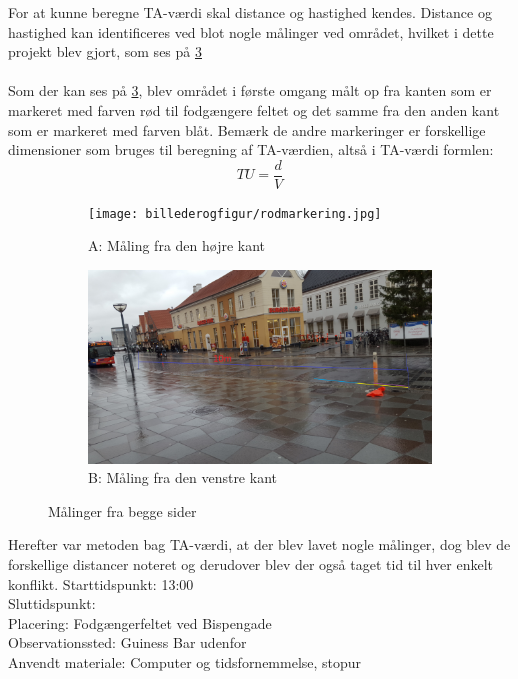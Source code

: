 For at kunne beregne TA-værdi skal distance og hastighed kendes. Distance og hastighed kan identificeres ved blot nogle målinger ved området, hvilket i dette projekt blev gjort, som ses på \cref{fig:maalingerfrabegge}
\\\\
Som der kan ses på \cref{fig:maalingerfrabegge}, blev området i første omgang målt op fra kanten som er markeret med farven rød til fodgængere feltet og det samme fra den anden kant som er markeret med farven blåt. Bemærk de andre markeringer er forskellige dimensioner som bruges til beregning af TA-værdien, altså i TA-værdi formlen: $$ TU=\frac{d}{V} $$
\begin{figure}
\centering
\begin{subfigure}{1\textwidth}
  \centering
  \texttt{[image: billederogfigur/rodmarkering.jpg]}
  \caption{A: Måling fra den højre kant}
  \label{fig:obsomrrod}
\end{subfigure}
\begin{subfigure}{1\textwidth}
  \centering
  \includegraphics[width=1\linewidth]{billederogfigur/blaamarkering.jpg}
  \caption{B: Måling fra den venstre kant}
  \label{fig:obsomrblaa}
\end{subfigure}
\caption{Målinger fra begge sider}
\label{fig:maalingerfrabegge}
\end{figure}
Herefter var metoden bag TA-værdi, at der blev lavet nogle målinger, dog blev de forskellige distancer noteret og derudover blev der også taget tid til hver enkelt konflikt.
Starttidspunkt: 13:00
\\
Sluttidspunkt:
\\
Placering: Fodgængerfeltet ved Bispengade
\\
Observationssted: Guiness Bar udenfor
\\
Anvendt materiale: Computer og tidsfornemmelse, stopur
